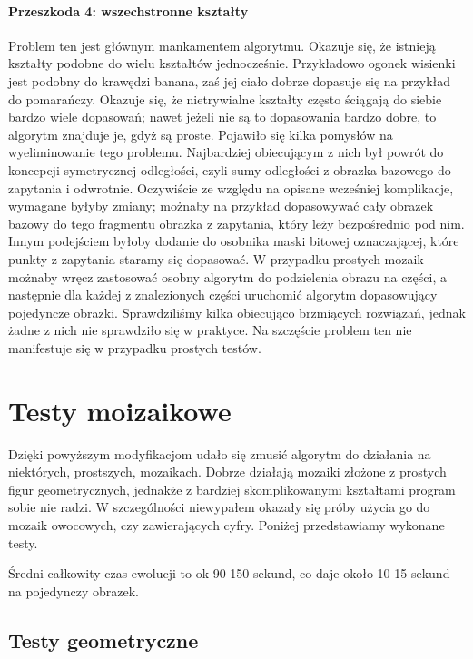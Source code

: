\documentclass[a4paper,12pt,leqno]{article}
\begin{document}
\paragraph{Przeszkoda 4: wszechstronne kształty}
Problem ten jest głównym mankamentem algorytmu. Okazuje się, że istnieją kształty podobne do wielu kształtów jednocześnie. Przykładowo ogonek wisienki jest podobny do
krawędzi banana, zaś jej ciało dobrze dopasuje się na przykład do pomarańczy. Okazuje się, że nietrywialne kształty często ściągają do siebie bardzo wiele dopasowań;
nawet jeżeli nie są to dopasowania bardzo dobre, to algorytm znajduje je, gdyż są proste.
Pojawiło się kilka pomysłów na wyeliminowanie tego problemu. Najbardziej obiecującym z nich był powrót do koncepcji symetrycznej odległości, czyli sumy odległości z obrazka bazowego
do zapytania i odwrotnie. Oczywiście ze względu na opisane wcześniej komplikacje, wymagane byłyby zmiany; możnaby na przykład dopasowywać cały obrazek bazowy do tego fragmentu obrazka
z zapytania, który leży bezpośrednio pod nim. Innym podejściem byłoby dodanie do osobnika maski bitowej oznaczającej, które punkty z zapytania staramy się dopasować. W przypadku prostych
mozaik możnaby wręcz zastosować osobny algorytm do podzielenia obrazu na części, a następnie dla każdej z znalezionych części uruchomić algorytm dopasowujący pojedyncze obrazki.
Sprawdziliśmy kilka obiecująco brzmiących rozwiązań, jednak żadne z nich nie sprawdziło się w praktyce. Na szczęście problem ten nie manifestuje się w przypadku prostych testów.

\section{Testy moizaikowe}

Dzięki powyższym modyfikacjom udało się zmusić algorytm do działania na niektórych, prostszych, mozaikach. Dobrze działają mozaiki złożone z prostych figur geometrycznych,
jednakże z bardziej skomplikowanymi kształtami program sobie nie radzi. W szczególności niewypałem okazały się próby użycia go do mozaik owocowych, czy zawierających cyfry.
Poniżej przedstawiamy wykonane testy. 

Średni całkowity czas ewolucji to ok 90-150 sekund, co daje około 10-15 sekund na pojedynczy obrazek.

\subsection{Testy geometryczne}
\end{document}

